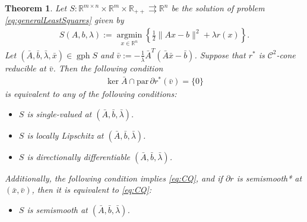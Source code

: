 \documentclass[reqno]{amsart}
\newtheorem{theorem}[proposition]{Theorem}
\numberwithin{equation}{section}
\newcommand{\R}{\mathbb{R}}
\newcommand{\argmin}{\operatorname{argmin}}
\newcommand{\para}{\mathrm{par}\,}
\begin{document}
\begin{theorem}\label{prop:stabilityc2}
    Let $S : \R^{m \times n} \times  \R^m \times \R_{++} \rightrightarrows \R^n$ be the solution of problem \eqref{eq:generalLeastSquares} given by 
    \begin{align*}
        S(A, b, \lambda) := \underset{x \in \R^n}{\argmin} \left\{\frac{1}{2}\lVert Ax - b \rVert^2 + \lambda r(x)\right\}. 
    \end{align*}
Let $(\bar{A}, \bar{b}, \bar{\lambda}, \bar{x}) \in \operatorname{gph} S$ and
    $\bar{v} := -\frac{1}{\bar{\lambda}} \bar{A}^T(\bar{A} \bar{x} - \bar{b})$. Suppose that  $r^*$ is $\mathcal{C}^2$-cone reducible at $\bar v$. Then the following condition
    \begin{align}\label{eq:CQ}
        \ker \bar{A} \cap \para \partial r^* (\bar{v}) = \{0\}
    \end{align}
    is equivalent to any of the following conditions:
    \begin{itemize}
        \item[(a)] $S$ is single-valued at $(\bar A, \bar b, \bar \lambda)$.
        \item[(b)] $S$ is locally Lipschitz at $(\bar A, \bar b, \bar \lambda)$.
        \item[(c)] $S$ is directionally differentiable $(\bar A, \bar b, \bar \lambda)$.
    \end{itemize}
    Additionally, the following condition implies \eqref{eq:CQ}, and if
    $\partial r$ is semismooth* at $(\bar x, \bar v)$, then it is equivalent to \eqref{eq:CQ}:
    \begin{itemize}
        \item[(d)] $S$ is semismooth at $(\bar A, \bar b, \bar \lambda)$.
    \end{itemize}

\end{theorem}
\end{document}
